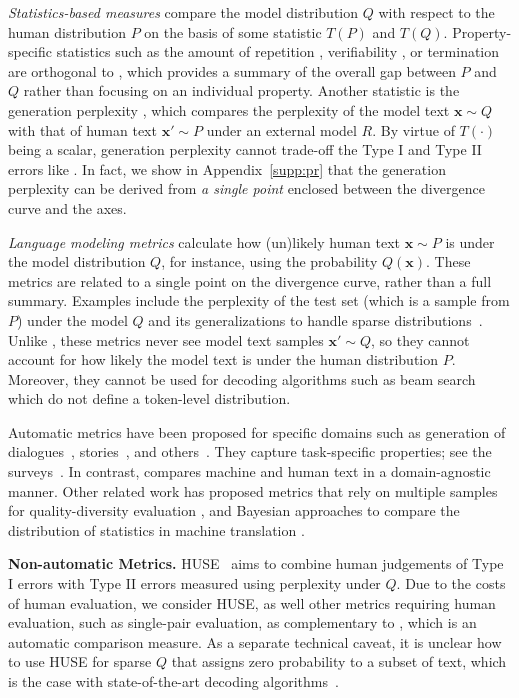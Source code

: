 \documentclass{article}
\newcommand{\myparagraph}[1]{\par\noindent\textbf{{#1}.}} %
\newcommand \xv {\bm{x}}
\theoremstyle{definition}
\newcommand{\name}{{\fontfamily{bch}\selectfont{\textsc{Mauve}}}\xspace}
\begin{document}
\textit{Statistics-based measures} compare
the model distribution $Q$ with respect to the human distribution $P$ on the basis of some statistic 
$T(P)$ and $T(Q)$. 
Property-specific statistics such as the amount of repetition \citep{holtzman2019curious,welleck2020neural}, verifiability \citep{massarelli2019decoding}, or termination \citep{welleck2020consistency} 
are orthogonal to \name, which provides a summary of the overall gap between $P$ and $Q$ rather than focusing on an individual property.
Another statistic is the generation perplexity \citep{fan2018heirarchical,holtzman2019curious},
which compares the perplexity of the model text $\xv \sim Q$ with that of human text $\xv' \sim P$ under an external model $R$.
By virtue of $T(\cdot)$ being a scalar, generation perplexity cannot trade-off the Type I and Type II errors
like \name. %
In fact, we show in Appendix~\ref{supp:pr} that the generation perplexity can be derived from {\em a single point} enclosed between the divergence curve and the axes. 


%
%
%
%
%
%
%
%
%
%

\textit{Language modeling metrics} calculate how (un)likely
human text $\xv\sim P$ is under the model distribution $Q$, for instance, using the probability $Q(\xv)$.  
These metrics are related to a single point on the divergence curve, rather than a full summary. 
Examples include the perplexity of the test set (which is a sample from $P$) under the model $Q$ and its generalizations to handle sparse distributions~\cite{martins2020sparse}. 
Unlike \name, these metrics never see model text samples $\xv' \sim Q$, so they cannot account for how likely the model text is under the human distribution $P$. 
Moreover, they cannot be used for decoding algorithms such as beam search which do not define a token-level distribution.

Automatic metrics have been proposed for specific domains such as generation of dialogues~\cite{tao2018ruber}, stories~\cite{guan2020union}, and others~\cite{optiz2021towards}. 
They capture task-specific properties; see the surveys~\cite{celikyilmaz2020evaluation,sai2020survey}.
In contrast, \name compares machine and human text in a domain-agnostic manner.
Other related work has proposed metrics that rely on multiple samples for quality-diversity evaluation  \cite{Caccia2020Language}, and Bayesian approaches to compare the distribution of statistics in machine translation \cite{eikema2020map}.

\myparagraph{Non-automatic Metrics} 
HUSE~\citep{hashimoto2019unifying} aims to combine human judgements of Type I errors with Type II errors measured using perplexity under $Q$. 
Due to the costs of human evaluation, we consider HUSE, as well other metrics requiring human evaluation, such as single-pair evaluation, as complementary to \name, which is an automatic comparison measure.
%
%
%
%
%
As a separate technical caveat, it is unclear how to use HUSE for sparse $Q$ that assigns zero probability to a subset of text, which is the case with state-of-the-art decoding algorithms~\cite{holtzman2019curious,martins2020sparse}.
\end{document}
